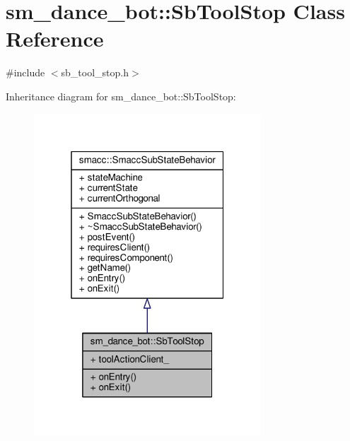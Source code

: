 \hypertarget{classsm__dance__bot_1_1SbToolStop}{}\section{sm\+\_\+dance\+\_\+bot\+:\+:Sb\+Tool\+Stop Class Reference}
\label{classsm__dance__bot_1_1SbToolStop}


{\ttfamily \#include $<$sb\+\_\+tool\+\_\+stop.\+h$>$}



Inheritance diagram for sm\+\_\+dance\+\_\+bot\+:\+:Sb\+Tool\+Stop\+:
\nopagebreak
\begin{figure}[H]
\begin{center}
\leavevmode
\includegraphics[width=241pt]{classsm__dance__bot_1_1SbToolStop__inherit__graph}
\end{center}
\end{figure}


